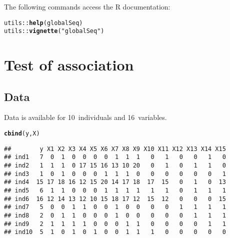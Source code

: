 \documentclass{article}\usepackage[]{graphicx}\usepackage[]{color}
\makeatletter
\newcommand{\hlstr}[1]{\textcolor[rgb]{0.192,0.494,0.8}{#1}}%
\newcommand{\hlopt}[1]{\textcolor[rgb]{0,0,0}{#1}}%
\newcommand{\hlstd}[1]{\textcolor[rgb]{0.345,0.345,0.345}{#1}}%
\newcommand{\hlkwd}[1]{\textcolor[rgb]{0.737,0.353,0.396}{\textbf{#1}}}%
\newenvironment{kframe}{%
 \def\at@end@of@kframe{}%
 \ifinner\ifhmode%
  \def\at@end@of@kframe{\end{minipage}}%
  \begin{minipage}{\columnwidth}%
 \fi\fi%
 \def\FrameCommand##1{\hskip\@totalleftmargin \hskip-\fboxsep
 \colorbox{shadecolor}{##1}\hskip-\fboxsep
     \hskip-\linewidth \hskip-\@totalleftmargin \hskip\columnwidth}%
 \MakeFramed {\advance\hsize-\width
   \@totalleftmargin\z@ \linewidth\hsize
   \@setminipage}}%
 {\par\unskip\endMakeFramed%
 \at@end@of@kframe}
\newenvironment{knitrout}{}{} %
\makeatother
\begin{document}


The following commands access the R documentation:
\begin{knitrout}
\color{fgcolor}\begin{kframe}
\begin{alltt}
\hlstd{utils}\hlopt{::}\hlkwd{help}\hlstd{(globalSeq)}
\hlstd{utils}\hlopt{::}\hlkwd{vignette}\hlstd{(}\hlstr{"globalSeq"}\hlstd{)}
\end{alltt}
\end{kframe}
\end{knitrout}

\newpage %
\section{Test of association} %
\label{TOA} %

\subsection{Data}
\label{TOA Data}

Data is available for 10~individuals and 16~variables.

\begin{knitrout}
\color{fgcolor}\begin{kframe}
\begin{alltt}
\hlkwd{cbind}\hlstd{(y,X)}
\end{alltt}
\begin{verbatim}
##        y X1 X2 X3 X4 X5 X6 X7 X8 X9 X10 X11 X12 X13 X14 X15
## ind1   7  0  1  0  0  0  0  1  1  1   0   1   0   0   1   0
## ind2   1  1  1  0 17 15 16 13 10 20   0   1   0   1   1   0
## ind3   1  0  1  0  0  0  1  1  1  0   0   0   0   0   0   1
## ind4  15 17 18 16 12 15 20 14 17 18  17  15   0   1   0  13
## ind5   6  1  1  0  0  0  1  1  1  1   1   1   0   1   1   1
## ind6  16 12 14 13 12 10 15 18 17 12  15  12   0   0   0  15
## ind7   5  0  0  1  1  0  0  1  0  0   0   0   1   1   1   1
## ind8   2  0  1  1  0  0  0  1  0  0   0   0   0   1   1   1
## ind9   2  1  1  1  1  0  0  0  1  1   0   0   0   0   1   1
## ind10  5  1  0  1  0  1  0  0  1  1   1   0   0   0   0   0
\end{verbatim}
\end{kframe}
\end{knitrout}
\end{document}
